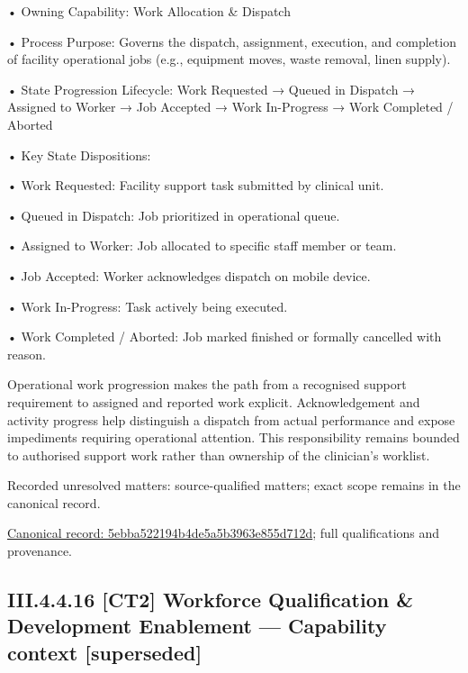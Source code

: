 •
Owning Capability: Work Allocation \& Dispatch



•
Process Purpose: Governs the dispatch, assignment, execution, and completion of facility operational jobs (e.g., equipment moves, waste removal, linen supply).



•
State Progression Lifecycle: Work Requested → Queued in Dispatch → Assigned to Worker → Job Accepted → Work In-Progress → Work Completed / Aborted



•
Key State Dispositions:



•
Work Requested: Facility support task submitted by clinical unit.



•
Queued in Dispatch: Job prioritized in operational queue.



•
Assigned to Worker: Job allocated to specific staff member or team.



•
Job Accepted: Worker acknowledges dispatch on mobile device.



•
Work In-Progress: Task actively being executed.



•
Work Completed / Aborted: Job marked finished or formally cancelled with reason.



Operational work progression makes the path from a recognised support requirement to assigned and reported work explicit. Acknowledgement and activity progress help distinguish a dispatch from actual performance and expose impediments requiring operational attention. This responsibility remains bounded to authorised support work rather than ownership of the clinician's worklist.


{\small Recorded unresolved matters: source-qualified matters; exact scope remains in the canonical record.}\par
{\footnotesize \href{../../../../../../../continuum/business/business-process/5ebba522194b4de5a5b3963e855d712d.md}{Canonical record: 5ebba522194b4de5a5b3963e855d712d}; full qualifications and provenance.}\par
\subsection*{III.4.4.16 [CT2] Workforce Qualification \& Development Enablement — Capability context [superseded]}
\label{navigation:III.4.4.16}

